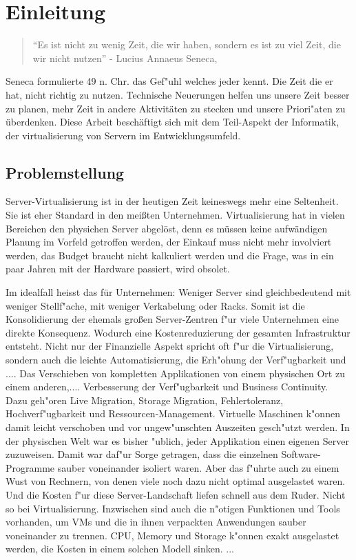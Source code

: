 \chapter{Einleitung}

\begin{quote}
	``Es ist nicht zu wenig Zeit, die wir haben, sondern es ist zu viel Zeit, die wir nicht nutzen'' - Lucius Annaeus Seneca, \cite{Apelt200511}
\end{quote}

Seneca formulierte  49 n. Chr. das Gef"uhl welches jeder kennt. Die Zeit die er hat, nicht richtig zu nutzen.
Technische Neuerungen helfen uns unsere Zeit besser zu planen, mehr Zeit in andere Aktivitäten zu stecken und unsere Priori"aten zu überdenken.
Diese Arbeit beschäftigt sich mit dem Teil-Aspekt der Informatik, der virtualisierung von Servern im Entwicklungsumfeld.

\section{Problemstellung}
Server-Virtualisierung ist in der heutigen Zeit keineswegs mehr eine Seltenheit. Sie ist eher Standard in den mei{\ss}ten Unternehmen.\newline
Virtualisierung hat in vielen Bereichen den physichen Server abgelöst, denn es müssen keine aufwändigen Planung im Vorfeld getroffen werden, der Einkauf muss nicht mehr involviert werden, das Budget braucht nicht kalkuliert werden und die Frage, was in ein paar Jahren mit der Hardware passiert, wird obsolet.

Im idealfall heisst das für Unternehmen: Weniger Server sind gleichbedeutend mit weniger Stellf"ache, mit weniger Verkabelung oder Racks. Somit ist die Konsolidierung der ehemals gro{\ss}en Server-Zentren f"ur viele Unternehmen eine direkte Konsequenz. 
Wodurch eine Kostenreduzierung der gesamten Infrastruktur entsteht.\newline
Nicht nur der Finanzielle Aspekt spricht oft f"ur die Virtualisierung, sondern auch die leichte Automatisierung, die Erh"ohung der Verf"ugbarkeit und ....\newline
Das Verschieben von kompletten Applikationen von einem physischen Ort zu einem anderen,....\newline
Verbesserung der Verf"ugbarkeit und Business Continuity. Dazu geh"oren Live Migration, Storage Migration, Fehlertoleranz, Hochverf"ugbarkeit und Ressourcen-Management. Virtuelle Maschinen k"onnen damit leicht verschoben und vor ungew"unschten Auszeiten gesch"utzt werden.\newline
In der physischen Welt war es bisher "ublich, jeder Applikation einen eigenen Server zuzuweisen. Damit war daf"ur Sorge getragen, dass die einzelnen Software-Programme sauber voneinander isoliert waren. Aber das f"uhrte auch zu einem Wust von Rechnern, von denen viele noch dazu nicht optimal ausgelastet waren. Und die Kosten f"ur diese Server-Landschaft liefen schnell aus dem Ruder. Nicht so bei Virtualisierung. Inzwischen sind auch die n"otigen Funktionen und Tools vorhanden, um VMs und die in ihnen verpackten Anwendungen sauber voneinander zu trennen. CPU, Memory und Storage k"onnen exakt ausgelastet werden, die Kosten in einem solchen Modell sinken.
...

